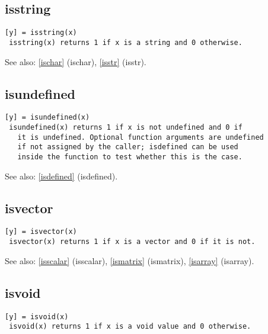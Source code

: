 \documentclass[a4paper]{article}
\begin{document}
\subsection{isstring\label{isstring}}

\begin{tscreen}
\begin{verbatim}
[y] = isstring(x)
 isstring(x) returns 1 if x is a string and 0 otherwise.
\end{verbatim}

See also: \ref{ischar} {(ischar)}, \ref{isstr} {(isstr)}.
\end{tscreen}



\subsection{isundefined\label{isundefined}}

\begin{tscreen}
\begin{verbatim}
[y] = isundefined(x)
 isundefined(x) returns 1 if x is not undefined and 0 if
   it is undefined. Optional function arguments are undefined
   if not assigned by the caller; isdefined can be used
   inside the function to test whether this is the case.
\end{verbatim}

See also: \ref{isdefined} {(isdefined)}.
\end{tscreen}



\subsection{isvector\label{isvector}}

\begin{tscreen}
\begin{verbatim}
[y] = isvector(x)
 isvector(x) returns 1 if x is a vector and 0 if it is not.
\end{verbatim}

See also: \ref{isscalar} {(isscalar)}, \ref{ismatrix} {(ismatrix)}, \ref{isarray} {(isarray)}.
\end{tscreen}



\subsection{isvoid\label{isvoid}}

\begin{tscreen}
\begin{verbatim}
[y] = isvoid(x)
 isvoid(x) returns 1 if x is a void value and 0 otherwise. 
\end{verbatim}
\end{tscreen}
\end{document}
